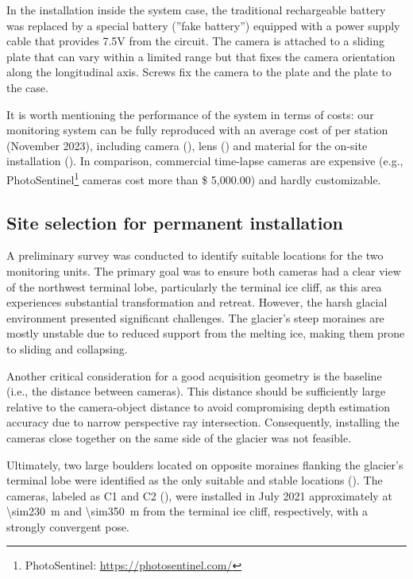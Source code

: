 In the installation inside the system case, the traditional rechargeable battery was replaced by a special battery 
(”fake battery”) equipped with a power supply cable that provides 7.5V from the circuit. 
The camera is attached to a sliding plate that can vary within a limited range but that fixes the camera orientation along the longitudinal axis. 
Screws fix the camera to the plate and the plate to the case.

It is worth mentioning the performance of the system in terms of costs: our monitoring system can be fully reproduced with an average cost of  per station (November 2023), including camera (), lens () and material for the on-site installation ().
In comparison, commercial time-lapse cameras are expensive (e.g., PhotoSentinel\footnote{PhotoSentinel: \url{https://photosentinel.com/}} cameras cost more than \$ 5,000.00) and hardly customizable. 

\subsection{Site selection for permanent installation}\label{sec:4:siteselection}

A preliminary survey was conducted to identify suitable locations for the two monitoring units. 
The primary goal was to ensure both cameras had a clear view of the northwest terminal lobe, particularly the terminal ice cliff,
as this area experiences substantial transformation and retreat. 
However, the harsh glacial environment presented significant challenges. 
The glacier's steep moraines are mostly unstable due to reduced support from the melting ice, making them prone to sliding and collapsing.

Another critical consideration for a good acquisition geometry is the baseline (i.e., the distance between cameras). 
This distance should be sufficiently large relative to the camera-object distance to avoid compromising depth estimation accuracy due to narrow perspective ray intersection. 
Consequently, installing the cameras close together on the same side of the glacier was not feasible.

Ultimately, two large boulders located on opposite moraines flanking the glacier's terminal lobe were identified as the only suitable and stable locations ().
The cameras, labeled as C1 and C2 (), were installed in July 2021 approximately at \SI{\sim230}{\meter} and \SI{\sim350}{\meter} from the terminal ice cliff, respectively, with a strongly convergent pose.

